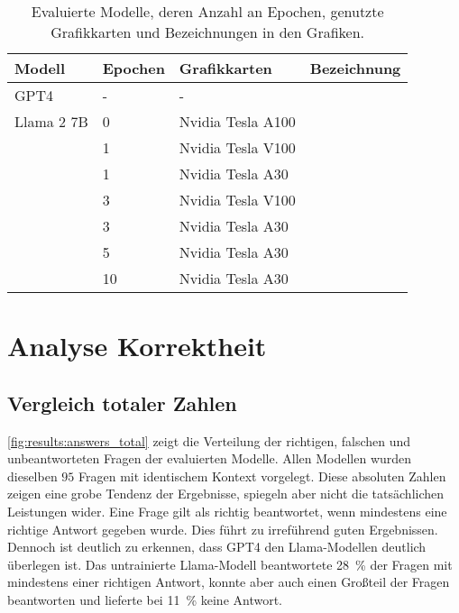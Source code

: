 \begin{table}
    \centering
    \begin{tabular}{llll}
        \toprule
        \textbf{Modell} & \textbf{Epochen} & \textbf{Grafikkarten} & \textbf{Bezeichnung} \\
        \midrule
        GPT4            & -                & -                     & \gpt{}               \\
        Llama 2 7B      & 0                & Nvidia Tesla A100     & \lo{}                \\
                        & 1                & Nvidia Tesla V100     & \liv{}               \\
                        & 1                & Nvidia Tesla A30      & \lia{}               \\
                        & 3                & Nvidia Tesla V100     & \lev{}               \\
                        & 3                & Nvidia Tesla A30      & \lea{}               \\
                        & 5                & Nvidia Tesla A30      & \lsa{}               \\
                        & 10               & Nvidia Tesla A30      & \lioa{}              \\
        \bottomrule
    \end{tabular}
    \caption[Evaluierte Modelle]{Evaluierte Modelle, deren Anzahl an Epochen, genutzte Grafikkarten und Bezeichnungen in den Grafiken.}\label{tab:eval-models}
\end{table}

\section{Analyse Korrektheit}\label{sec:results:correctness}
\subsection{Vergleich totaler Zahlen}

\cref{fig:results:answers_total} zeigt die Verteilung der richtigen, falschen und unbeantworteten Fragen der evaluierten Modelle.
Allen Modellen wurden dieselben $95$ Fragen mit identischem Kontext vorgelegt.
Diese absoluten Zahlen zeigen eine grobe Tendenz der Ergebnisse, spiegeln aber nicht die tatsächlichen Leistungen wider.
Eine Frage gilt als richtig beantwortet, wenn mindestens eine richtige Antwort gegeben wurde.
Dies führt zu irreführend guten Ergebnissen.
Dennoch ist deutlich zu erkennen, dass GPT4 den Llama-Modellen deutlich überlegen ist.
Das untrainierte Llama-Modell beantwortete \SI{28}{\percent} der Fragen mit mindestens einer richtigen Antwort, konnte aber auch einen Großteil der Fragen beantworten und lieferte bei \SI{11}{\percent} keine Antwort. \\

